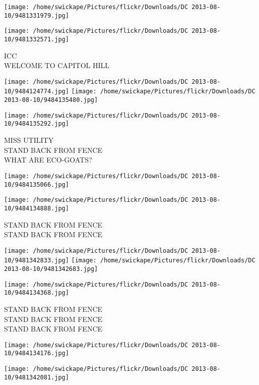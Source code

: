 \documentclass[10pt,letterpaper]{article}
\begin{document}
\texttt{[image: /home/swickape/Pictures/flickr/Downloads/DC 2013-08-10/9481331979.jpg]}

\vspace{0.25in}
\texttt{[image: /home/swickape/Pictures/flickr/Downloads/DC 2013-08-10/9481332571.jpg]}

ICC\\
WELCOME TO CAPITOL HILL\\
\pagebreak

\texttt{[image: /home/swickape/Pictures/flickr/Downloads/DC 2013-08-10/9484124774.jpg]}
\texttt{[image: /home/swickape/Pictures/flickr/Downloads/DC 2013-08-10/9484135480.jpg]}

\vspace{0.25in}
\texttt{[image: /home/swickape/Pictures/flickr/Downloads/DC 2013-08-10/9484135292.jpg]}

MISS UTILITY\\
STAND BACK FROM FENCE\\
WHAT ARE ECO{-}GOATS?\\
\pagebreak

\texttt{[image: /home/swickape/Pictures/flickr/Downloads/DC 2013-08-10/9484135066.jpg]}

\vspace{0.25in}
\texttt{[image: /home/swickape/Pictures/flickr/Downloads/DC 2013-08-10/9484134888.jpg]}

STAND BACK FROM FENCE\\
STAND BACK FROM FENCE\\
\pagebreak

\texttt{[image: /home/swickape/Pictures/flickr/Downloads/DC 2013-08-10/9481342833.jpg]}
\texttt{[image: /home/swickape/Pictures/flickr/Downloads/DC 2013-08-10/9481342683.jpg]}

\vspace{0.25in}
\texttt{[image: /home/swickape/Pictures/flickr/Downloads/DC 2013-08-10/9484134368.jpg]}

STAND BACK FROM FENCE\\
STAND BACK FROM FENCE\\
STAND BACK FROM FENCE\\
\pagebreak

\texttt{[image: /home/swickape/Pictures/flickr/Downloads/DC 2013-08-10/9484134176.jpg]}

\vspace{0.25in}
\texttt{[image: /home/swickape/Pictures/flickr/Downloads/DC 2013-08-10/9481342081.jpg]}
\end{document}
